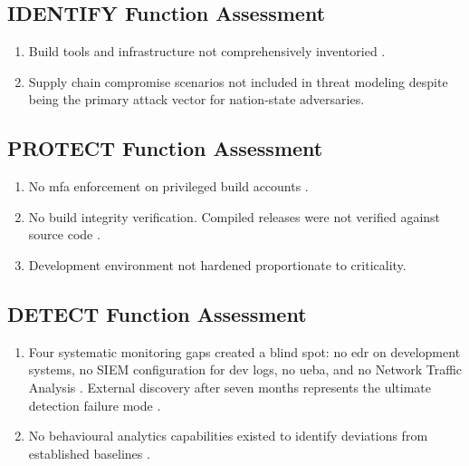 \subsection{IDENTIFY Function Assessment}
\begin{enumerate}
    \item {} Build tools and infrastructure not comprehensively inventoried \cite{openhearing2021}.
    \item {} Supply chain compromise scenarios not included in threat modeling despite being the primary attack vector for nation-state adversaries.
\end{enumerate}

\subsection{PROTECT Function Assessment}
\begin{enumerate}
    \item {} No \gls{mfa} enforcement on privileged build accounts \cite{nagle2023}.
    \item {} No build integrity verification. Compiled releases were not verified against source code \cite{nagle2023}.
    \item {} Development environment not hardened proportionate to criticality.
\end{enumerate}

\subsection{DETECT Function Assessment}
\begin{enumerate}
    \item {} Four systematic monitoring gaps created a blind spot: no \gls{edr} on development systems, no SIEM configuration for dev logs, no \gls{ueba}, and no Network Traffic Analysis \cite{nagle2023}. External discovery after seven months represents the ultimate detection failure mode \cite{nelson2025}.
    \item {} No behavioural analytics capabilities existed to identify deviations from established baselines \cite{nelson2025}.
\end{enumerate}
